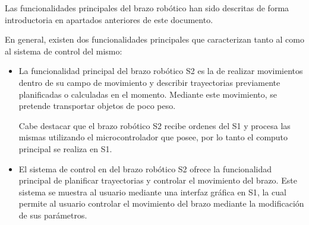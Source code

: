 Las funcionalidades principales del brazo robótico han sido descritas de forma introductoria en apartados anteriores de este documento.

En general, existen dos funcionalidades principales que caracterizan tanto al \pArm{} como al sistema de control del mismo:
\begin{itemize}
    \item La funcionalidad principal del brazo robótico \ac{S2} es la de realizar movimientos dentro de su campo de movimiento y describir trayectorias previamente planificadas o calculadas en el momento. Mediante este movimiento, se pretende transportar objetos de poco peso.
    
    Cabe destacar que el brazo robótico \ac{S2} recibe ordenes del \ac{S1} y procesa las mismas utilizando el microcontrolador que posee, por lo tanto el computo principal se realiza en \ac{S1}.
    
    \item El sistema de control en  del brazo robótico \ac{S2} ofrece la funcionalidad principal de planificar trayectorias y controlar el movimiento del brazo. Este sistema se muestra al usuario mediante una interfaz gráfica en \ac{S1}, la  cual permite al usuario controlar el movimiento del brazo mediante la modificación de sus parámetros.
\end{itemize}
